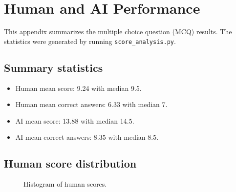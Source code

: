 \documentclass{article}
\begin{document}
\section*{Human and AI Performance}
This appendix summarizes the multiple choice question (MCQ) results.
The statistics were generated by running \texttt{score\_analysis.py}.

\subsection*{Summary statistics}
\begin{itemize}
  \item Human mean score: 9.24 with median 9.5.
  \item Human mean correct answers: 6.33 with median 7.
  \item AI mean score: 13.88 with median 14.5.
  \item AI mean correct answers: 8.35 with median 8.5.
\end{itemize}

\subsection*{Human score distribution}
\begin{figure}[h]
  \centering
  \caption{Histogram of human scores.}
\end{figure}
\end{document}
